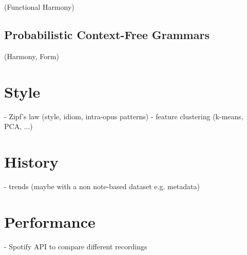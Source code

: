 \documentclass{book}
\begin{document}
(Functional Harmony)

\section{Probabilistic Context-Free Grammars}

(Harmony, Form)

\chapter{Style}

- Zipf's law (style, idiom, intra-opus patterns) \citep{Meyer1989}
- feature clustering (k-means, PCA, ...)

\chapter{History}

- trends (maybe with a non note-based dataset e.g. metadata)

\chapter{Performance}

- Spotify API to compare different recordings



\printbibliography
\end{document}
